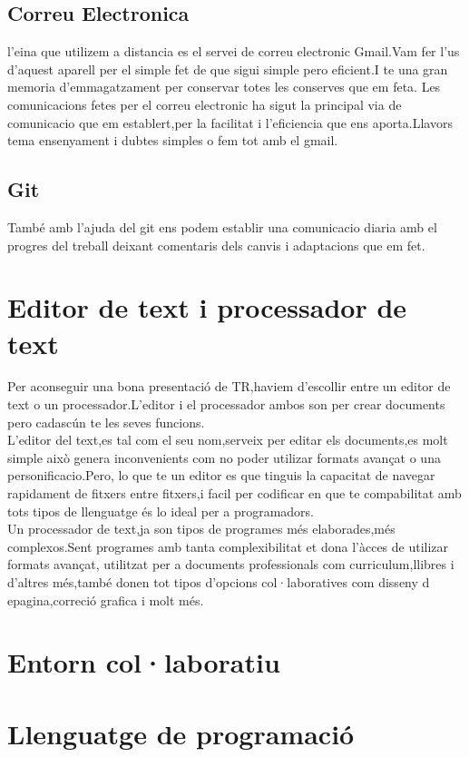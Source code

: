 \subsection{Correu Electronica}
l'eina que utilizem a distancia es el servei de correu electronic Gmail.Vam fer l'us d'aquest aparell per el simple fet de que sigui simple pero eficient.I te una gran memoria d'emmagatzament per conservar totes les conserves que em feta.
Les comunicacions fetes per el correu electronic ha sigut la principal via de comunicacio que em establert,per la facilitat i l'eficiencia que ens aporta.Llavors tema ensenyament i dubtes simples o fem tot amb el gmail.

\subsection{Git}
També amb l'ajuda del git ens podem establir una comunicacio diaria amb el progres del treball deixant comentaris dels canvis i adaptacions que em fet.


\section{Editor de text i processador de text}\label{4.2}
Per aconseguir una bona presentació de TR,haviem d'escollir entre un editor de text o un processador.L'editor i el processador ambos son per crear documents pero cadascún te les seves funcions.\\
L'editor del text,es tal com el seu nom,serveix per editar els documents,es molt simple això genera inconvenients com no poder utilizar formats avançat o una personificacio.Pero, lo que te un editor es que tinguis la capacitat de navegar rapidament de fitxers entre fitxers,i facil per codificar en que te compabilitat amb tots tipos de llenguatge és lo ideal per a programadors.\\
Un processador de text,ja son tipos de programes més elaborades,més complexos.Sent programes amb tanta complexibilitat et dona l'àcces de utilizar formats avançat, utilitzat per a documents professionals com curriculum,llibres i d'altres més,també donen tot tipos d'opcions col·laboratives com disseny d epagina,correció grafica i molt més.

\section{Entorn col·laboratiu}\label{4.3}
\section{Llenguatge de programació}\label{4.4}

